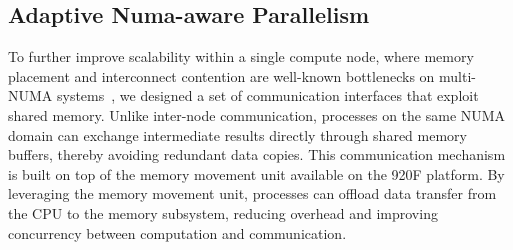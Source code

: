 \subsection{Adaptive Numa-aware Parallelism}
To further improve scalability within a single compute node, where memory placement and interconnect contention are well-known bottlenecks on multi-NUMA systems~\cite{majo2011numa}, we designed a set of communication interfaces that exploit shared memory. Unlike inter-node communication, processes on the same NUMA domain can exchange intermediate results directly through shared memory buffers, thereby avoiding redundant data copies.
This communication mechanism is built on top of the memory movement unit available on the 920F platform. By leveraging the memory movement unit, processes can offload data transfer from the CPU to the memory subsystem, reducing overhead and improving concurrency between computation and communication.



